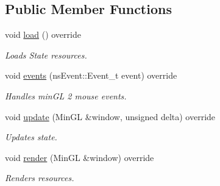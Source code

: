 \subsection*{Public Member Functions}
\begin{DoxyCompactItemize}
\item 
void \hyperlink{class_main_menu_state_a723f41a3c34138c5c5f7dcafc076718e}{load} () override
\begin{DoxyCompactList}\small\item\em Loads State resources. \end{DoxyCompactList}\item 
void \hyperlink{class_main_menu_state_a6d740479d4dce733c069921478d70a37}{events} (ns\+Event\+::\+Event\+\_\+t event) override
\begin{DoxyCompactList}\small\item\em Handles min\+GL 2 mouse events. \end{DoxyCompactList}\item 
void \hyperlink{class_main_menu_state_a7846cc7f1bd9b1fc40d77cc8f7644e03}{update} (Min\+GL \&window, unsigned delta) override
\begin{DoxyCompactList}\small\item\em Updates state. \end{DoxyCompactList}\item 
void \hyperlink{class_main_menu_state_a1f11855f3b961e7a71c7c4e16f0b3478}{render} (Min\+GL \&window) override
\begin{DoxyCompactList}\small\item\em Renders resources. \end{DoxyCompactList}\end{DoxyCompactItemize}

